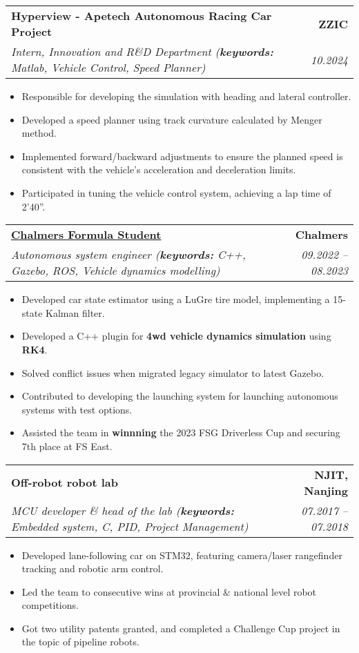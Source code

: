 \documentclass[letterpaper,11pt]{article}
\makeatletter
\newcommand{\resumeItem}[1]{
  \item\small{
    {#1 \vspace{-2pt}}
  }
}
\newcommand{\resumeSubheading}[4]{
  \vspace{-2pt}\item\small{
    \begin{tabular*}{0.97\textwidth}[t]{l@{\extracolsep{\fill}}r}
      \textbf{#1} & \textbf{#2} \\
      \textit{#3} & \textit{#4} \\
    \end{tabular*}\vspace{-7pt}
  }
}
\newcommand{\resumeItemListStart}{\begin{itemize}}
\newcommand{\resumeItemListEnd}{\end{itemize}\vspace{-5pt}}
\makeatother
\begin{document}
  \resumeSubheading
  {Hyperview - Apetech Autonomous Racing Car Project}{ZZIC}
  {Intern, Innovation and R\&D Department (\textbf{keywords:} Matlab, Vehicle Control, Speed Planner)}{10.2024}
  \resumeItemListStart
    \resumeItem{Responsible for developing the simulation with heading and lateral controller.}
    \resumeItem{Developed a speed planner using track curvature calculated by Menger method.}
    \resumeItem{Implemented forward/backward adjustments to ensure the planned speed is consistent with the vehicle's acceleration and deceleration limits.}
    \resumeItem{Participated in tuning the vehicle control system, achieving a lap time of 2'40''.}
  \resumeItemListEnd

  \resumeSubheading
  {\href{https://www.chalmersformulastudent.se/cfs-2023-car-margareta}{Chalmers Formula Student \faExternalLink}}{Chalmers}
    {Autonomous system engineer (\textbf{keywords:} C++, Gazebo, ROS, Vehicle dynamics modelling)}{09.2022 -- 08.2023}
    \resumeItemListStart 
      \resumeItem{Developed car state estimator using a LuGre tire model, implementing a 15-state Kalman filter.}
      \resumeItem{Developed a C++ plugin for \textbf{4wd vehicle dynamics simulation} using \textbf{RK4}.}
      \resumeItem{Solved conflict issues when migrated legacy simulator to latest Gazebo.}
      \resumeItem{Contributed to developing the launching system for launching autonomous systems with test options.} 
      \resumeItem{Assisted the team in \textbf{winnning} the   2023 FSG Driverless Cup and securing 7th place at FS East.} 
    \resumeItemListEnd

    
  \resumeSubheading
    {Off-robot robot lab}{NJIT, Nanjing}
    {MCU developer \& head of the lab (\textbf{keywords: }Embedded system, C, PID, Project Management)}{07.2017 -- 07.2018}
    \resumeItemListStart
      \resumeItem{Developed lane-following car on STM32, featuring camera/laser rangefinder tracking and robotic arm control.} 
      \resumeItem{Led the team to consecutive wins at provincial \& national level robot competitions.}
      \resumeItem{Got two utility patents granted, and completed a Challenge Cup project in the topic of pipeline robots.}
    \resumeItemListEnd
\end{document}
